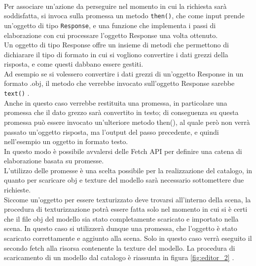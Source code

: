 \\ 
Per associare un’azione da perseguire nel momento in cui la richiesta sarà soddisfatta, si invoca sulla promessa un metodo \texttt{then()}, che come input prende un’oggetto di tipo \texttt{Response}, e una funzione che implementa i passi di elaborazione con cui processare l’oggetto Response una volta ottenuto.
\\
Un oggetto di tipo Response offre un insieme di metodi che permettono di dichiarare il tipo di formato in cui si vogliono convertire i dati grezzi della risposta, e come questi dabbano essere gestiti.
\\
Ad esempio se si volessero convertire i dati grezzi di un’oggetto Response in un formato .obj, il metodo che verrebbe invocato sull’oggetto Response sarebbe \texttt{text()} . 
\\
Anche in questo caso verrebbe restituita una promessa, in particolare una promessa che il dato grezzo sarà convertito in testo; di conseguenza su questa promessa può essere invocato un’ulteriore metodo then(), al quale però non verrà passato un’oggetto risposta, ma l’output del passo precedente, e quindi nell’esempio un oggetto in formato testo.
\\ 
In questo modo è possibile avvalersi delle Fetch API per definire una catena di elaborazione basata su promesse.
\\  
L’utilizzo delle promesse è una scelta possibile per la realizzazione del catalogo, in quanto per scaricare obj e texture del modello sarà necessario sottomettere due richieste.
\\
Siccome un’oggetto per essere texturizzato deve trovarsi all’interno della scena, la procedura di texturizzazione potrà essere fatta solo nel momento in cui si è certi che il file obj del modello sia stato completamente scaricato e importato nella scena. In questo caso si utilizzerà dunque una promessa, che l’oggetto è stato scaricato correttamente e aggiunto alla scena. Solo in questo caso verrà eseguito il secondo fetch alla risorsa contenente la texture del modello.
La procedura di scaricamento di un modello dal catalogo è riassunta in figura \ref{fig:editor_2} .
\\
